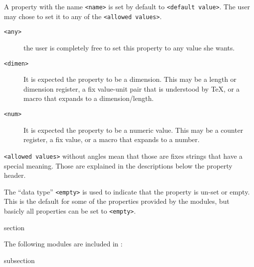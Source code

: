 {\let\noindex\relax{}}

A property with the name \texttt{<name>} is set by default to
\texttt{<default value>}. The user may chose to set it to any of the
\texttt{<allowed values>}.
\begin{description}
\item[\texttt{<any>}]  the user is completely free to set this
  property to any value she wants.
\item[\texttt{<dimen>}] It is expected the property to be a
  dimension. This may be a length or dimension register, a fix
  value-unit pair that is understood by \TeX, or a macro that expands
  to a dimension/length.
\item[\texttt{<num>}] It is expected the property to be a numeric
  value. This may be a counter register, a fix value, or a macro that
  expands to a number.
\end{description}
\lstinline{<allowed values>} without angles mean that those are fixes
strings that have a special meaning. Those are explained in the
descriptions below the property header.

The “data type” \texttt{<empty>} is used to indicate that the property
is un-set or empty. This is the default for some of the properties
provided by the {\CoCoTeX} modules, but basicly all properties can
be set to \texttt{<empty>}.


\begin{Heading}{section}
\end{Heading}

The following modules are included in {\CoCoTeX}:

\begin{Heading}{subsection}
\end{Heading}

